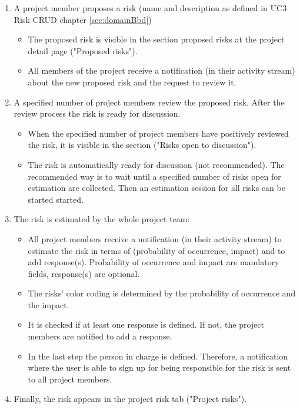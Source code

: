 \begin{enumerate}
	\vspace{-3mm}
	\setlength\itemsep{-1em}
	
	\item A project member proposes a risk (name and description as defined in UC3 Risk CRUD chapter \ref{sec:domainBbd})
	\begin{itemize}
		\vspace{-3mm}
		\setlength\itemsep{-1em}
		
		\item The proposed risk is visible in the section proposed risks at the project detail page ("Proposed risks").
		\item All members of the project receive a notification (in their activity stream) about the new proposed risk and the request to review it.
	\end{itemize}
	
	\item A specified number of project members review the proposed risk. After the review process the risk is ready for discussion.
	\begin{itemize}
		\vspace{-3mm}
		\setlength\itemsep{-1em}
		
		\item When the specified number of project members have positively reviewed the risk, it is visible in the section ("Risks open to discussion").
		\item The risk is automatically ready for discussion (not recommended). The recommended way is to wait until a specified number of risks open for estimation are collected. Then an estimation session for all risks can be started started.
	\end{itemize}
	
	\item The risk is estimated by the whole project team:
	\begin{itemize}
		\vspace{-3mm}
		\setlength\itemsep{-1em}
		
		\item All project members receive a notification (in their activity stream) to estimate the risk in terms of (probability of occurrence, impact) and to add response(s). Probability of occurrence and impact are mandatory fields, response(s) are optional.
		\item The risks' color coding is determined by the probability of occurrence and the impact.
		\item It is checked if at least one response is defined. If not, the project members are notified to add a response.
		\item In the last step the person in charge is defined. Therefore, a notification where the user is able to sign up for being responsible for the risk is sent to all project members.  
	\end{itemize}
	
	\item Finally, the risk appears in the project risk tab ("Project risks").
\end{enumerate}


